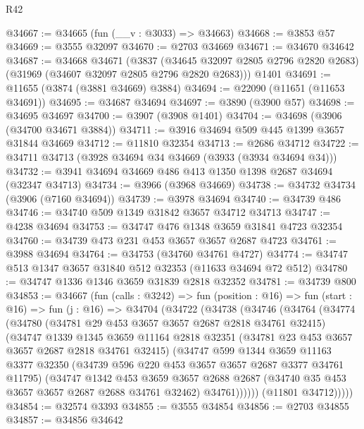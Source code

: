 \begin{lexlean}{R42}
\begin{coremodule}
@34667 := @34665 (fun (__v : @3033) => @34663)
@34668 := @3853 @57
@34669 := @3555 @32097
@34670 := @2703 @34669
@34671 := @34670 @34642
@34687 := @34668
    @34671
    (@3837 (@34645 @32097 @2805 @2796 @2820 @2683) (@31969 (@34607 @32097 @2805 @2796 @2820 @2683)))
    @1401
@34691 := @11655 (@3874 (@3881 @34669) @3884)
@34694 := @22090 (@11651 (@11653 @34691))
@34695 := @34687 @34694
@34697 := @3890 (@3900 @57)
@34698 := @34695 @34697
@34700 := @3907 (@3908 @1401)
@34704 := @34698 (@3906 (@34700 @34671 @3884))
@34711 := @3916 @34694 @509 @445 @1399 @3657 @31844 @34669
@34712 := @11810 @32354
@34713 := @2686 @34712
@34722 := @34711 @34713 (@3928 @34694 @34 @34669 (@3933 (@3934 @34694 @34)))
@34732 := @3941 @34694 @34669 @486 @413 @1350 @1398 @2687 @34694 (@32347 @34713)
@34734 := @3966 (@3968 @34669)
@34738 := @34732 @34734 (@3906 (@7160 @34694))
@34739 := @3978 @34694
@34740 := @34739 @486
@34746 := @34740 @509 @1349 @31842 @3657 @34712 @34713
@34747 := @4238 @34694
@34753 := @34747 @476 @1348 @3659 @31841 @4723 @32354
@34760 := @34739 @473 @231 @453 @3657 @3657 @2687 @4723
@34761 := @3988 @34694
@34764 := @34753 (@34760 @34761 @4727)
@34774 := @34747 @513 @1347 @3657 @31840 @512 @32353 (@11633 @34694 @72 @512)
@34780 := @34747 @1336 @1346 @3659 @31839 @2818 @32352
@34781 := @34739 @800
@34853 := @34667
    (fun (calls : @3242) =>
    fun (position : @16) =>
    fun (start : @16) =>
    fun (j : @16) =>
    @34704
      (@34722
        (@34738
          (@34746
            (@34764
              (@34774
                (@34780
                  (@34781 @29 @453 @3657 @3657 @2687 @2818 @34761 @32415)
                  (@34747
                    @1339
                    @1345
                    @3659
                    @11164
                    @2818
                    @32351
                    (@34781 @23 @453 @3657 @3657 @2687 @2818 @34761 @32415)
                    (@34747
                      @599
                      @1344
                      @3659
                      @11163
                      @3377
                      @32350
                      (@34739 @596 @220 @453 @3657 @3657 @2687 @3377 @34761 @11795)
                      (@34747
                        @1342
                        @453
                        @3659
                        @3657
                        @2688
                        @2687
                        (@34740 @35 @453 @3657 @3657 @2687 @2688 @34761 @32462)
                        @34761))))))
            (@11801 @34712)))))
@34854 := @32574 @3393
@34855 := @3555 @34854
@34856 := @2703 @34855
@34857 := @34856 @34642

\end{coremodule}
\end{lexlean}
